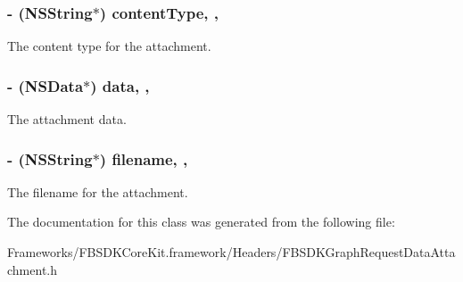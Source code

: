\subsubsection[{content\+Type}]{\setlength{\rightskip}{0pt plus 5cm}-\/ (N\+S\+String$\ast$) content\+Type\hspace{0.3cm}{\ttfamily [read]}, {\ttfamily [nonatomic]}, {\ttfamily [copy]}}\label{interface_f_b_s_d_k_graph_request_data_attachment_a721d770bcb1b89e4e23d084320636651}
The content type for the attachment. \hypertarget{interface_f_b_s_d_k_graph_request_data_attachment_add74d6b28d7630f13c711afbfed387c6}{}
\subsubsection[{data}]{\setlength{\rightskip}{0pt plus 5cm}-\/ (N\+S\+Data$\ast$) data\hspace{0.3cm}{\ttfamily [read]}, {\ttfamily [nonatomic]}, {\ttfamily [strong]}}\label{interface_f_b_s_d_k_graph_request_data_attachment_add74d6b28d7630f13c711afbfed387c6}
The attachment data. \hypertarget{interface_f_b_s_d_k_graph_request_data_attachment_a65650c18882e736fc9ddc322008a4a88}{}
\subsubsection[{filename}]{\setlength{\rightskip}{0pt plus 5cm}-\/ (N\+S\+String$\ast$) filename\hspace{0.3cm}{\ttfamily [read]}, {\ttfamily [nonatomic]}, {\ttfamily [copy]}}\label{interface_f_b_s_d_k_graph_request_data_attachment_a65650c18882e736fc9ddc322008a4a88}
The filename for the attachment. 

The documentation for this class was generated from the following file\+:\begin{DoxyCompactItemize}
\item 
Frameworks/\+F\+B\+S\+D\+K\+Core\+Kit.\+framework/\+Headers/F\+B\+S\+D\+K\+Graph\+Request\+Data\+Attachment.\+h\end{DoxyCompactItemize}
